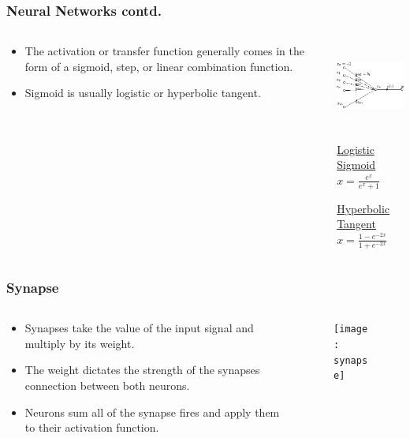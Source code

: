 \documentclass{beamer}
\begin{document}
   \begin{frame}
      \frametitle{Neural Networks contd.}
      \begin{columns}[T]
         \begin{column}[T]{5cm}
            \begin{itemize}
               \item The activation or transfer function generally comes in the form of a sigmoid, step, or linear combination function.
               \item Sigmoid is usually logistic or hyperbolic tangent.
            \end{itemize}
         \end{column}
         \begin{column}[T]{5cm}
            \includegraphics[height=2.8cm]{artificial_neuron}
                  \begin{center}
                     \underline{Logistic Sigmoid} \\
                     $ x = \frac{e^{x}}{e^{x}+1} $
                  \end{center}
                  \begin{center}
                     \underline{Hyperbolic Tangent} \\
                     $ x = \frac{1 - e^{-2x}}{1 + e^{-2x}} $
                  \end{center}
         \end{column}
      \end{columns}
   \end{frame}

   \begin{frame}
      \frametitle{Synapse}
      \begin{columns}[T]
         \begin{column}[T]{5cm}
            \begin{itemize}
               \item Synapses take the value of the input signal and multiply by its weight.
               \item The weight dictates the strength of the synapses connection between both neurons.
               \item Neurons sum all of the synapse fires and apply them to their activation function.
            \end{itemize}
         \end{column}
         \begin{column}[T]{5cm}
            \begin{figure}[htbp]
               \texttt{[image: synapse]}
            \end{figure}
         \end{column}
      \end{columns}
   \end{frame}
\end{document}
